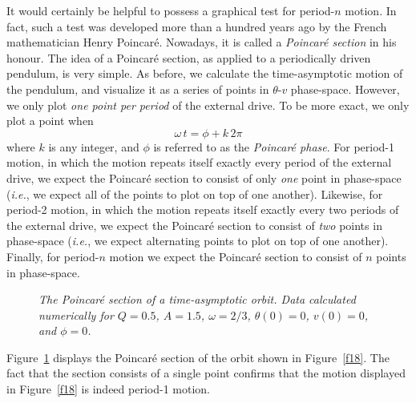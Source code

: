 It would certainly be helpful
to possess a graphical test for period-$n$ motion. In fact, such a test was developed more than a
 hundred years ago by the
French mathematician Henry Poincar\'{e}. Nowadays, it is called a
{\em Poincar\'{e} section}\/ in his honour. The idea of a  Poincar\'{e} section, as applied
to a periodically driven pendulum,  is very simple.
As before, we calculate the time-asymptotic motion of the pendulum, and visualize it as a
series of points in $\theta$-$v$
phase-space. However, we only plot {\em one point per period}\/ of the external drive. To be more
exact, we only plot a point when
\begin{equation}
\omega\,t = \phi + k\,2\pi
\end{equation}
where $k$ is any integer, and $\phi$ is referred to as the {\em Poincar\'{e} phase}. 
For period-1 motion, in which the motion repeats itself exactly every period of the
external drive, we expect the Poincar\'{e} section to consist of only {\em one} point
in phase-space ({\em i.e.},  we expect all of the points to plot on top of one another). 
Likewise, for period-2 motion, in which the motion repeats itself exactly every two periods of the
external drive, we expect the Poincar\'{e} section to consist of  {\em two}\/ points
in phase-space ({\em i.e.},  we expect alternating  points to plot on top of one another).
Finally, for period-$n$ motion we expect the Poincar\'{e} section to consist of  $n$ points
in phase-space.

\begin{figure}
\epsfysize=2.5in
\centerline{}
\caption{\em The Poincar\'{e} section of a time-asymptotic
orbit. Data calculated numerically for $Q=0.5$, $A=1.5$, $\omega=2/3$, $\theta(0)=0$,
$v(0)=0$, and $\phi=0$. }\label{f19}
\end{figure}

Figure~\ref{f19} displays the Poincar\'{e} section of the orbit shown in Figure~\ref{f18}. 
The fact that the section consists of a single point confirms that the motion
displayed in Figure~\ref{f18} is indeed period-1 motion.


